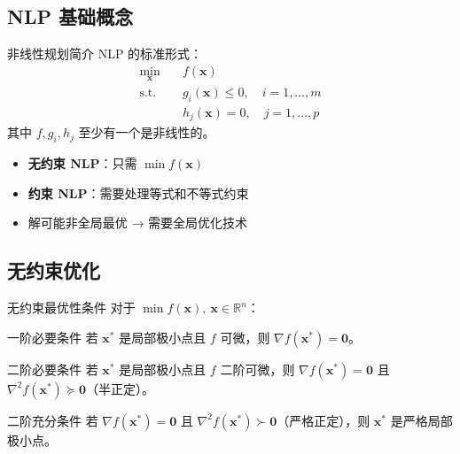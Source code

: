 \documentclass[11pt, aspectratio=169, svgnames, table, fontset=fandol]{ctexbeamer}
\newcommand{\R}{\mathbb{R}}
\begin{document}
\subsection{NLP 基础概念}

\begin{frame}{非线性规划简介}
  NLP 的标准形式：
  \begin{align*}
    \min_{\bm{x}} \quad & f(\bm{x}) \\
    \text{s.t.} \quad   & g_i(\bm{x}) \leq 0,\quad i = 1,\dots,m \\
                        & h_j(\bm{x}) = 0,\quad j = 1,\dots,p
  \end{align*}
  其中 $f, g_i, h_j$ 至少有一个是非线性的。

  \vspace{8pt}
  \begin{itemize}
    \item \textbf{无约束 NLP}：只需 $\min f(\bm{x})$
    \item \textbf{约束 NLP}：需要处理等式和不等式约束
    \item 解可能非全局最优 → 需要全局优化技术
  \end{itemize}
\end{frame}

\subsection{无约束优化}

\begin{frame}{无约束最优性条件}
  对于 $\min f(\bm{x}),\ \bm{x} \in \R^n$：

  \begin{block}{一阶必要条件}
    若 $\bm{x}^*$ 是局部极小点且 $f$ 可微，则 $\nabla f(\bm{x}^*) = \bm{0}$。
  \end{block}

  \begin{block}{二阶必要条件}
    若 $\bm{x}^*$ 是局部极小点且 $f$ 二阶可微，则 $\nabla f(\bm{x}^*) = \bm{0}$ 且 $\nabla^2 f(\bm{x}^*) \succcurlyeq \bm{0}$（半正定）。
  \end{block}

  \begin{block}{二阶充分条件}
    若 $\nabla f(\bm{x}^*) = \bm{0}$ 且 $\nabla^2 f(\bm{x}^*) \succ \bm{0}$（严格正定），则 $\bm{x}^*$ 是严格局部极小点。
  \end{block}
\end{frame}
\end{document}

